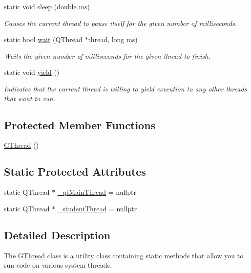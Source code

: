 \begin{DoxyCompactItemize}
static void \mbox{\hyperlink{classGThread_aa3381590c1ef33c08000c2fbb2bf0dd0}{sleep}} (double ms)
\begin{DoxyCompactList}\small\item\em Causes the current thread to pause itself for the given number of milliseconds. \end{DoxyCompactList}\item 
static bool \mbox{\hyperlink{classGThread_afea6c84cef875ea16de7a6a0373ecb3e}{wait}} (Q\+Thread $\ast$thread, long ms)
\begin{DoxyCompactList}\small\item\em Waits the given number of milliseconds for the given thread to finish. \end{DoxyCompactList}\item 
static void \mbox{\hyperlink{classGThread_a58c8b2ad0ea491a6642e5e1cbd358c89}{yield}} ()
\begin{DoxyCompactList}\small\item\em Indicates that the current thread is willing to yield execution to any other threads that want to run. \end{DoxyCompactList}\end{DoxyCompactItemize}
\subsection*{Protected Member Functions}
\begin{DoxyCompactItemize}
\item 
\mbox{\hyperlink{classGThread_a7db4904140090c18f864e09283f2b529}{G\+Thread}} ()
\end{DoxyCompactItemize}
\subsection*{Static Protected Attributes}
\begin{DoxyCompactItemize}
\item 
static Q\+Thread $\ast$ \mbox{\hyperlink{classGThread_aa69140e62a4dad275e74a6c1174eb4e5}{\+\_\+qt\+Main\+Thread}} = nullptr
\item 
static Q\+Thread $\ast$ \mbox{\hyperlink{classGThread_a15ae7c95a54d17d2c307ebba42fe3405}{\+\_\+student\+Thread}} = nullptr
\end{DoxyCompactItemize}


\subsection{Detailed Description}
The \mbox{\hyperlink{classGThread}{G\+Thread}} class is a utility class containing static methods that allow you to run code on various system threads. 

